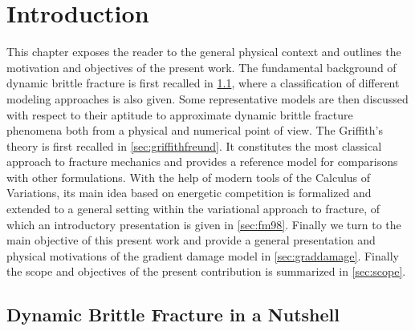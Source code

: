 \chapter{Introduction} \label{chap:introduction}
\minitoc

This chapter exposes the reader to the general physical context and outlines the motivation and objectives of the present work. The fundamental background of dynamic brittle fracture is first recalled in \cref{sec:dynafrac}, where a classification of different modeling approaches is also given. Some representative models are then discussed with respect to their aptitude to approximate dynamic brittle fracture phenomena both from a physical and numerical point of view. The Griffith's theory is first recalled in \cref{sec:griffithfreund}. It constitutes the most classical approach to fracture mechanics and provides a reference model for comparisons with other formulations. With the help of modern tools of the Calculus of Variations, its main idea based on energetic competition is formalized and extended to a general setting within the variational approach to fracture, of which an introductory presentation is given in \cref{sec:fm98}. Finally we turn to the main objective of this present work and provide a general presentation and physical motivations of the gradient damage model in \cref{sec:graddamage}. Finally the scope and objectives of the present contribution is summarized in \cref{sec:scope}.

\section{Dynamic Brittle Fracture in a Nutshell} \label{sec:dynafrac}
